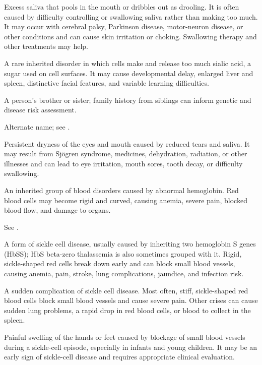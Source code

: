  Excess saliva that pools in the mouth or dribbles out as drooling. It is often caused by difficulty controlling or swallowing saliva rather than making too much. It may occur with cerebral palsy, Parkinson disease, motor-neuron disease, or other conditions and can cause skin irritation or choking. Swallowing therapy and other treatments may help.

 A rare inherited disorder in which cells make and release too much sialic acid, a sugar used on cell surfaces. It may cause developmental delay, enlarged liver and spleen, distinctive facial features, and variable learning difficulties.

 A person's brother or sister; family history from siblings can inform genetic and disease risk assessment.

 Alternate name; see .

 Persistent dryness of the eyes and mouth caused by reduced tears and saliva. It may result from Sjögren syndrome, medicines, dehydration, radiation, or other illnesses and can lead to eye irritation, mouth sores, tooth decay, or difficulty swallowing.

 An inherited group of blood disorders caused by abnormal hemoglobin. Red blood cells may become rigid and curved, causing anemia, severe pain, blocked blood flow, and damage to organs.

 See .

 A form of sickle cell disease, usually caused by inheriting two hemoglobin S genes (HbSS); HbS beta-zero thalassemia is also sometimes grouped with it. Rigid, sickle-shaped red cells break down early and can block small blood vessels, causing anemia, pain, stroke, lung complications, jaundice, and infection risk.

 A sudden complication of sickle cell disease. Most often, stiff, sickle-shaped red blood cells block small blood vessels and cause severe pain. Other crises can cause sudden lung problems, a rapid drop in red blood cells, or blood to collect in the spleen.

 Painful swelling of the hands or feet caused by blockage of small blood vessels during a sickle-cell
episode, especially in infants and young children. It may be an early sign of sickle-cell disease
and requires appropriate clinical evaluation.

